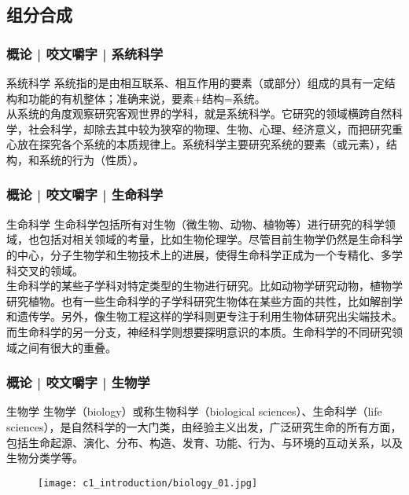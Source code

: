 \subsection{组分合成}
\begin{frame}
  \frametitle{概论 | 咬文嚼字 | 系统科学}
  \begin{block}{系统科学}
系统指的是由相互联系、相互作用的要素（或部分）组成的具有一定结构和功能的有机整体；准确来说，要素+结构=系统。\\
\vspace{1em}
从系统的角度观察研究客观世界的学科，就是系统科学。它研究的领域横跨自然科学，社会科学，却除去其中较为狭窄的物理、生物、心理、经济意义，而把研究重心放在探究各个系统的本质规律上。系统科学主要研究系统的要素（或元素），结构，和系统的行为（性质）。 
  \end{block}
\end{frame}

\begin{frame}
  \frametitle{概论 | 咬文嚼字 | 生命科学}
  \begin{block}{生命科学}
生命科学包括所有对生物（微生物、动物、植物等）进行研究的科学领域，也包括对相关领域的考量，比如生物伦理学。尽管目前生物学仍然是生命科学的中心，分子生物学和生物技术上的进展，使得生命科学正成为一个专精化、多学科交叉的领域。\\
    \vspace{1em}
生命科学的某些子学科对特定类型的生物进行研究。比如动物学研究动物，植物学研究植物。也有一些生命科学的子学科研究生物体在某些方面的共性，比如解剖学和遗传学。另外，像生物工程这样的学科则更专注于利用生物体研究出尖端技术。而生命科学的另一分支，神经科学则想要探明意识的本质。生命科学的不同研究领域之间有很大的重叠。\\
  \end{block}
\end{frame}

\begin{frame}
  \frametitle{概论 | 咬文嚼字 | 生物学}
  \begin{block}{生物学}
   生物学（biology）或称生物科学（biological sciences）、生命科学（life sciences），是自然科学的一大门类，由经验主义出发，广泛研究生命的所有方面，包括生命起源、演化、分布、构造、发育、功能、行为、与环境的互动关系，以及生物分类学等。\\
  \end{block}
  \begin{figure}
    \centering
    \texttt{[image: c1\_introduction/biology\_01.jpg]}
  \end{figure}
\end{frame}

